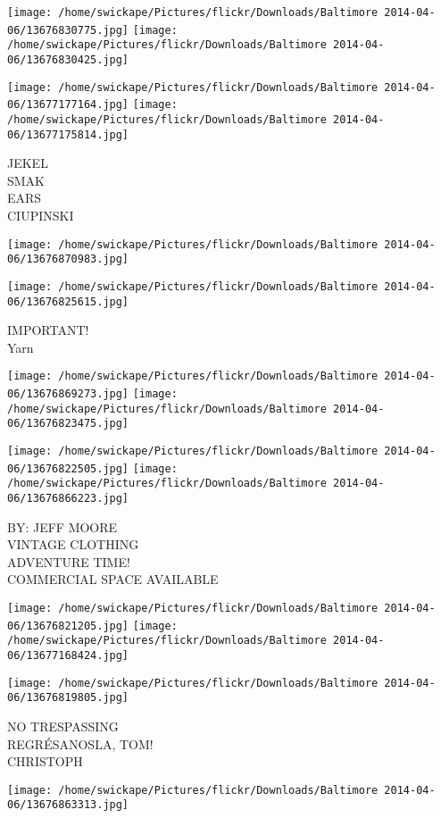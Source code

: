 \documentclass[10pt,letterpaper]{article}
\begin{document}
\texttt{[image: /home/swickape/Pictures/flickr/Downloads/Baltimore 2014-04-06/13676830775.jpg]}
\texttt{[image: /home/swickape/Pictures/flickr/Downloads/Baltimore 2014-04-06/13676830425.jpg]}

\texttt{[image: /home/swickape/Pictures/flickr/Downloads/Baltimore 2014-04-06/13677177164.jpg]}
\texttt{[image: /home/swickape/Pictures/flickr/Downloads/Baltimore 2014-04-06/13677175814.jpg]}

JEKEL\\
SMAK\\
EARS\\
CIUPINSKI
\pagebreak

\texttt{[image: /home/swickape/Pictures/flickr/Downloads/Baltimore 2014-04-06/13676870983.jpg]}

\vspace{0.25in}
\texttt{[image: /home/swickape/Pictures/flickr/Downloads/Baltimore 2014-04-06/13676825615.jpg]}

IMPORTANT!\\
Yarn
\pagebreak

\texttt{[image: /home/swickape/Pictures/flickr/Downloads/Baltimore 2014-04-06/13676869273.jpg]}
\texttt{[image: /home/swickape/Pictures/flickr/Downloads/Baltimore 2014-04-06/13676823475.jpg]}

\texttt{[image: /home/swickape/Pictures/flickr/Downloads/Baltimore 2014-04-06/13676822505.jpg]}
\texttt{[image: /home/swickape/Pictures/flickr/Downloads/Baltimore 2014-04-06/13676866223.jpg]}

BY: JEFF MOORE\\
VINTAGE CLOTHING\\
ADVENTURE TIME!\\
COMMERCIAL SPACE AVAILABLE
\pagebreak

\texttt{[image: /home/swickape/Pictures/flickr/Downloads/Baltimore 2014-04-06/13676821205.jpg]}
\texttt{[image: /home/swickape/Pictures/flickr/Downloads/Baltimore 2014-04-06/13677168424.jpg]}

\texttt{[image: /home/swickape/Pictures/flickr/Downloads/Baltimore 2014-04-06/13676819805.jpg]}

NO TRESPASSING\\
REGRÉSANOSLA, TOM!\\
CHRISTOPH
\pagebreak

\texttt{[image: /home/swickape/Pictures/flickr/Downloads/Baltimore 2014-04-06/13676863313.jpg]}
\end{document}

